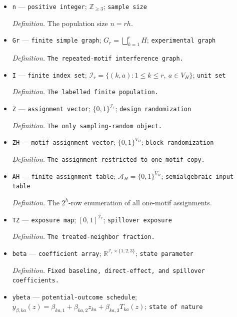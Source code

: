 \documentclass{article}
\begin{document}
\begin{itemize}
  \par\smallskip\noindent\emph{Definition.} \texttt{The number of motif copies.}
  \item \texttt{n} --- \texttt{positive integer}; \(\mathbb Z_{\ge3}\); \texttt{sample size}
  \par\smallskip\noindent\emph{Definition.} The population size \(n=rh\).
  \item \texttt{Gr} --- \texttt{finite simple graph}; \(G_r=\bigsqcup_{k=1}^rH\); \texttt{experimental graph}
  \par\smallskip\noindent\emph{Definition.} \texttt{The repeated-\allowbreak{}motif interference graph.}
  \item \texttt{I} --- \texttt{finite index set}; \(\mathcal I_r=\{(k,a):1\le k\le r,\ a\in V_H\}\); \texttt{unit set}
  \par\smallskip\noindent\emph{Definition.} \texttt{The labelled finite population.}
  \item \texttt{Z} --- \texttt{assignment vector}; \(\{0,1\}^{\mathcal I_r}\); \texttt{design randomization}
  \par\smallskip\noindent\emph{Definition.} \texttt{The only sampling-\allowbreak{}random object.}
  \item \texttt{ZH} --- \texttt{motif assignment vector}; \(\{0,1\}^{V_H}\); \texttt{block randomization}
  \par\smallskip\noindent\emph{Definition.} \texttt{The assignment restricted to one motif copy.}
  \item \texttt{AH} --- \texttt{finite assignment table}; \(\mathcal A_H=\{0,1\}^{V_H}\); \texttt{semialgebraic input table}
  \par\smallskip\noindent\emph{Definition.} The \(2^h\)-row enumeration of all one-motif assignments.
  \item \texttt{TZ} --- \texttt{exposure map}; \([0,1]^{\mathcal I_r}\); \texttt{spillover exposure}
  \par\smallskip\noindent\emph{Definition.} \texttt{The treated-\allowbreak{}neighbor fraction.}
  \item \texttt{beta} --- \texttt{coefficient array}; \(\mathbb R^{\mathcal I_r\times\{1,2,3\}}\); \texttt{state parameter}
  \par\smallskip\noindent\emph{Definition.} \texttt{Fixed baseline,\allowbreak{} direct-\allowbreak{}effect,\allowbreak{} and spillover coefficients.}
  \item \texttt{ybeta} --- \texttt{potential-\allowbreak{}outcome schedule}; \(y_{\beta,ka}(z)=\beta_{ka,1}+\beta_{ka,2}z_{ka}+\beta_{ka,3}T_{ka}(z)\); \texttt{state of nature}

\end{itemize}
\end{document}
